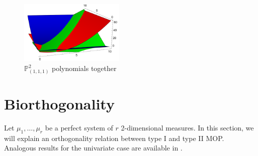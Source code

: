\documentclass[12pt,a4]{article}
\theoremstyle{plain}
\begin{document}
  \begin{figure}[h]
    \centering\includegraphics[width=5cm]{./img/EjemploLaguerre.png}
    \caption{$\mathbb P_{(1,1,1)}^2$ polynomials together}
    \label{fig:example-2}
  \end{figure}

\section{Biorthogonality}

Let $\mu_1,\dots,\mu_r$ be a perfect system of $r$ 2-dimensional measures. In this section, we will explain an orthogonality relation between type I and type II MOP. Analogous results for the univariate case are available in \cite[Theorem 23.1.6]{Ismail}.
\end{document}

